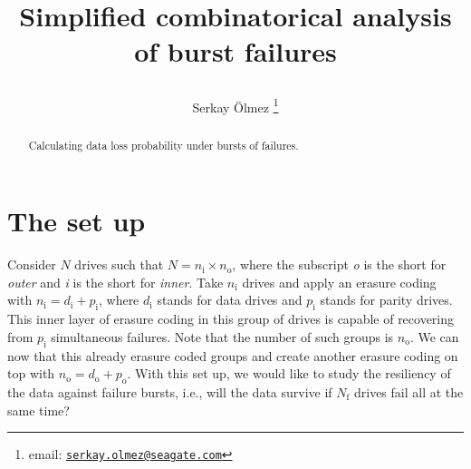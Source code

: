 \documentclass[journal]{IEEEtran}
\title{Simplified combinatorical analysis of burst failures \author{Serkay Ölmez \thanks{email: \href{mailto:serkay.olmez@seagate.com}{\nolinkurl{serkay.olmez@seagate.com}}}}  }
\begin{document}
\onecolumn
%    


{%
\setlength{\parindent}{0pt}
\thispagestyle{plain}
{\fontsize{18}{20}\selectfont\raggedright 
\maketitle  %

}


}










\begin{abstract}


\noindent Calculating data loss probability under bursts of failures.

\vskip 8.5pt



\end{abstract}


\vskip -8.5pt



\noindent  

\hypertarget{TOC}{}

\hypertarget{the-set-up}{%
\section{The set up}\label{the-set-up}}

Consider \(N\) drives such that \(N=n_\text{i}\times n_\text{o}\), where the subscript \emph{o} is the short for \emph{outer} and \emph{i} is the short for \emph{inner}. Take \(n_\text{i}\) drives and apply an erasure coding with \(n_\text{i}=d_\text{i}+p_\text{i}\), where \(d_\text{i}\) stands for data drives and \(p_\text{i}\) stands for parity drives. This inner layer of erasure coding in this group of drives is capable of recovering from \(p_\text{i}\) simultaneous failures. Note that the number of such groups is \(n_\text{o}\). We can now that this already erasure coded groups and create another erasure coding on top with \(n_\text{o}=d_\text{o}+p_\text{o}\). With this set up, we would like to study the resiliency of the data against failure bursts, i.e., will the data survive if \(N_\text{f}\) drives fail all at the same time?
\end{document}
